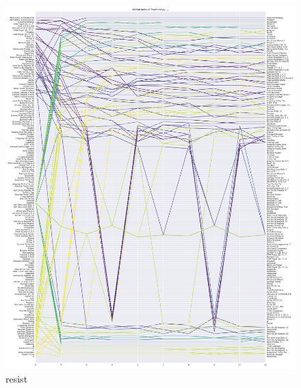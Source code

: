 \documentclass{article}
\begin{document}
\begin{figure}[!hbtp]
    \centering
    \includegraphics[height=.9\textheight]{./img/median_rank_vs_population_size_resist.pdf}
    \caption{resist}
    \label{fig:ranks_v_size_resist}
\end{figure}
\end{document}
